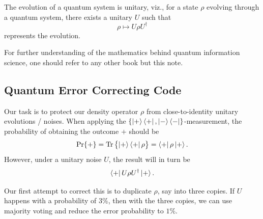 The evolution of a quantum system is unitary, viz., for a state $\rho$ evolving through a quantum system, there exists a unitary $U$ such that
\begin{equation}
    \rho \mapsto U \rho U^\dagger
\end{equation}
represents the evolution.

For further understanding of the mathematics behind quantum information science, one should refer to any other book but this note.

\subsection{Quantum Error Correcting Code}
Our task is to protect our density operator $\rho$ from close-to-identity unitary evolutions / noises. When applying the $\{\left|{+}\right\rangle\left\langle{+}\right|,\left|{-}\right\rangle\left\langle{-}\right|\}$-measurement, the probability of obtaining the outcome $+$ should be
\begin{equation*}
    \mathrm{Pr}\{+\} = \mathrm{Tr}\left\{{\left|{+}\right\rangle\left\langle{+}\right|\rho}\right\} = \left\langle{+}\right|\rho\left|{+}\right\rangle.
\end{equation*}
However, under a unitary noise $U$, the result will in turn be
\begin{equation*}
    \left\langle{+}\right|U \rho U^\dagger\left|{+}\right\rangle.
\end{equation*}

Our first attempt to correct this is to duplicate $\rho$, say into three copies. If $U$ happens with a probability of $3\%$, then with the three copies, we can use majority voting and reduce the error probability to $1\%$.

